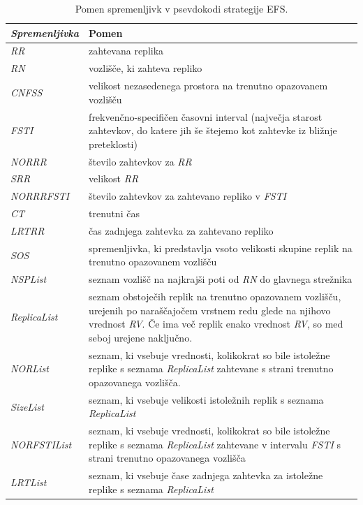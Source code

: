 \documentclass[a4paper, 12pt]{book}
\begin{document}
\begin{table}
\small
  \begin{center}
    \begin{tabulary}{1.0\textwidth}{ >{\itshape}p{6.8em} p{26em}}
      \textnormal{Spremenljivka} & Pomen \\
      \hline
      RR & zahtevana replika \\
      RN &  vozlišče, ki zahteva repliko \\
      CNFSS & velikost nezasedenega prostora na trenutno opazovanem
          \mbox{vozlišču} \\
      FSTI & frekvenčno-specifičen časovni interval (največja starost
         zahtevkov, do katere jih še štejemo kot zahtevke iz bližnje
         preteklosti) \\
      NORRR & število zahtevkov za \textit{RR} \\
      SRR & velikost \textit{RR} \\
      NORRRFSTI & število zahtevkov za zahtevano repliko
          v \textit{FSTI} \\
      CT & trenutni čas \\
      LRTRR & čas zadnjega zahtevka za zahtevano repliko \\
      SOS & spremenljivka, ki predstavlja vsoto velikosti skupine replik na
          trenutno opazovanem vozlišču \\
      NSPList & seznam vozlišč na najkrajši poti od \textit{RN} do
          glavnega strežnika \\
      ReplicaList & seznam obstoječih replik na trenutno opazovanem vozlišču,
          urejenih po naraščajočem vrstnem redu glede na njihovo vrednost
          \textit{RV}. Če ima več replik enako vrednost \textit{RV}, so med
          seboj urejene naključno. \\
      NORList & seznam, ki vsebuje vrednosti, kolikokrat so bile istoležne
          replike s seznama \textit{ReplicaList} zahtevane s strani
          trenutno opazovanega vozlišča. \\
      SizeList & seznam, ki vsebuje velikosti istoležnih replik s seznama
          \textit{ReplicaList} \\
      NORFSTIList & seznam, ki vsebuje vrednosti, kolikokrat so bile istoležne
          replike s seznama \textit{ReplicaList} zahtevane v intervalu
          \textit{FSTI} s strani trenutno opazovanega vozlišča \\
      LRTList & seznam, ki vsebuje čase zadnjega zahtevka za istoležne
          replike s seznama \textit{ReplicaList}
    \end{tabulary}
 \end{center}

  \caption{Pomen spremenljivk v psevdokodi strategije EFS.}
  \label{tbl:EFS_vars}
\end{table}
\end{document}
